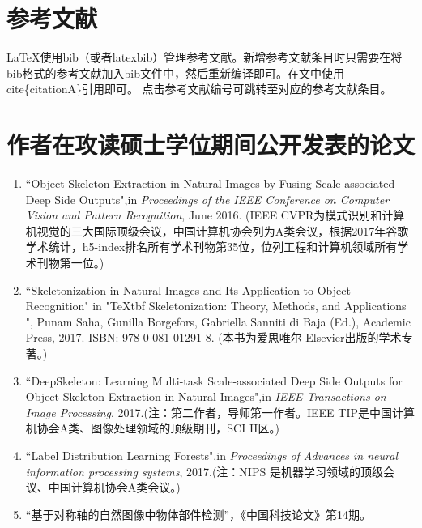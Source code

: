 \documentclass[UTF8]{ctexart}
\numberwithin{equation}{section} %
\numberwithin{table}{section} %
\begin{document}
\section{参考文献}
\LaTeX 使用bib（或者latexbib）管理参考文献。新增参考文献条目时只需要在将bib格式的参考文献加入bib文件中，然后重新编译即可。在文中使用cite\{citationA\}引用即可。
点击参考文献编号\cite{shen2017deepskeleton}可跳转至对应的参考文献条目。

\pagebreak
{} %



\pagebreak
{} %
\section*{作者在攻读硕士学位期间公开发表的论文}
\begin{enumerate}
\item “Object Skeleton Extraction in Natural Images by Fusing Scale-associated Deep Side Outputs",in \emph{Proceedings of the IEEE Conference on Computer Vision and Pattern Recognition}, June 2016.
(IEEE CVPR为模式识别和计算机视觉的三大国际顶级会议，中国计算机协会列为A类会议，根据2017年谷歌学术统计，h5-index排名所有学术刊物第35位，位列工程和计算机领域所有学术刊物第一位。)

\item “Skeletonization in Natural Images and Its Application to Object Recognition" in "\TeX tbf{ Skeletonization: Theory, Methods, and Applications }", Punam Saha, Gunilla Borgefors, Gabriella Sanniti di Baja (Ed.), 
Academic Press, 2017. ISBN: 978-0-081-01291-8. (本书为爱思唯尔 Elsevier出版的学术专著。)

\item “DeepSkeleton: Learning Multi-task Scale-associated Deep Side Outputs for Object Skeleton Extraction in Natural Images",in \emph{IEEE Transactions on Image Processing}, 2017.(注：第二作者，导师第一作者。IEEE TIP是中国计算机协会A类、图像处理领域的顶级期刊，SCI II区。)

\item “Label Distribution Learning Forests",in \emph{Proceedings of Advances in neural information processing systems}, 2017.(注：NIPS 是机器学习领域的顶级会议、中国计算机协会A类会议。)

\item “基于对称轴的自然图像中物体部件检测”，《中国科技论文》第14期。

\end{enumerate}
\end{document}
